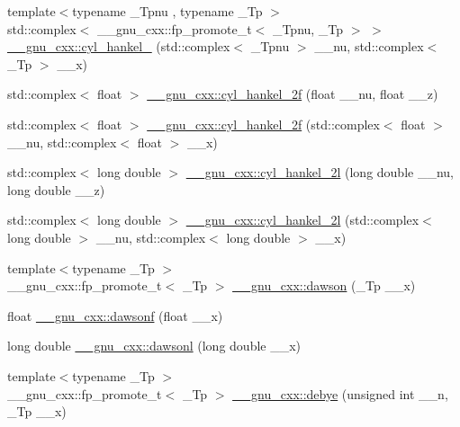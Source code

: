 \begin{DoxyCompactItemize}
\item 
{\footnotesize template$<$typename \+\_\+\+Tpnu , typename \+\_\+\+Tp $>$ }\\std\+::complex$<$ \+\_\+\+\_\+gnu\+\_\+cxx\+::fp\+\_\+promote\+\_\+t$<$ \+\_\+\+Tpnu, \+\_\+\+Tp $>$ $>$ \hyperlink{group__mathsf__gnu_ga326764c0d2dca072c411573503968e50}{\+\_\+\+\_\+gnu\+\_\+cxx\+::cyl\+\_\+hankel\+\_} (std\+::complex$<$ \+\_\+\+Tpnu $>$ \+\_\+\+\_\+nu, std\+::complex$<$ \+\_\+\+Tp $>$ \+\_\+\+\_\+x)
\item 
std\+::complex$<$ float $>$ \hyperlink{group__mathsf__gnu_ga2b75361870975c47d57bed71b4064ce7}{\+\_\+\+\_\+gnu\+\_\+cxx\+::cyl\+\_\+hankel\+\_\+2f} (float \+\_\+\+\_\+nu, float \+\_\+\+\_\+z)
\item 
std\+::complex$<$ float $>$ \hyperlink{group__mathsf__gnu_gae21f9d09b937eaf9729982da5a382f20}{\+\_\+\+\_\+gnu\+\_\+cxx\+::cyl\+\_\+hankel\+\_\+2f} (std\+::complex$<$ float $>$ \+\_\+\+\_\+nu, std\+::complex$<$ float $>$ \+\_\+\+\_\+x)
\item 
std\+::complex$<$ long double $>$ \hyperlink{group__mathsf__gnu_ga4babb91ca6906f237e8bd1f0f1a10509}{\+\_\+\+\_\+gnu\+\_\+cxx\+::cyl\+\_\+hankel\+\_\+2l} (long double \+\_\+\+\_\+nu, long double \+\_\+\+\_\+z)
\item 
std\+::complex$<$ long double $>$ \hyperlink{group__mathsf__gnu_ga1ac6434925254bd02e108f5a4e52b34d}{\+\_\+\+\_\+gnu\+\_\+cxx\+::cyl\+\_\+hankel\+\_\+2l} (std\+::complex$<$ long double $>$ \+\_\+\+\_\+nu, std\+::complex$<$ long double $>$ \+\_\+\+\_\+x)
\item 
{\footnotesize template$<$typename \+\_\+\+Tp $>$ }\\\+\_\+\+\_\+gnu\+\_\+cxx\+::fp\+\_\+promote\+\_\+t$<$ \+\_\+\+Tp $>$ \hyperlink{group__mathsf__gnu_gabc97cbc04fdd23593e8dccbc1421dad5}{\+\_\+\+\_\+gnu\+\_\+cxx\+::dawson} (\+\_\+\+Tp \+\_\+\+\_\+x)
\item 
float \hyperlink{group__mathsf__gnu_ga0a1b8e6760b8c7869127d41d96209318}{\+\_\+\+\_\+gnu\+\_\+cxx\+::dawsonf} (float \+\_\+\+\_\+x)
\item 
long double \hyperlink{group__mathsf__gnu_ga6647a7444ff9c7c1f2a8ed36761bfeb2}{\+\_\+\+\_\+gnu\+\_\+cxx\+::dawsonl} (long double \+\_\+\+\_\+x)
\item 
{\footnotesize template$<$typename \+\_\+\+Tp $>$ }\\\+\_\+\+\_\+gnu\+\_\+cxx\+::fp\+\_\+promote\+\_\+t$<$ \+\_\+\+Tp $>$ \hyperlink{group__mathsf__gnu_ga0b14de47c011de3ebf771c9f29b2b78c}{\+\_\+\+\_\+gnu\+\_\+cxx\+::debye} (unsigned int \+\_\+\+\_\+n, \+\_\+\+Tp \+\_\+\+\_\+x)

\end{DoxyCompactItemize}
